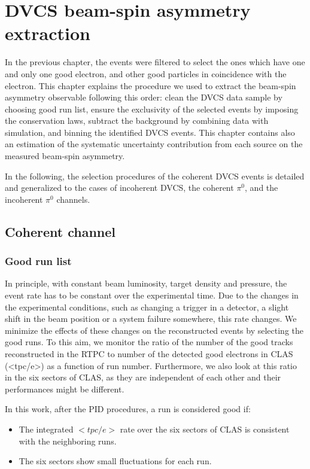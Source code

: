 \chapter{DVCS beam-spin asymmetry extraction}

In the previous chapter, the events were filtered to select the ones which have 
one and only one good electron, and other good particles in coincidence with 
the electron. This chapter explains the procedure we used to extract the 
beam-spin asymmetry observable following this order: clean the DVCS data sample 
by choosing good run list, ensure the exclusivity of the selected events by 
imposing the conservation laws, subtract the background by combining data with 
simulation, and binning the identified DVCS events. This chapter contains also 
an estimation of the systematic uncertainty contribution from each source on 
the measured beam-spin asymmetry.

In the following, the selection procedures of the coherent DVCS events is 
detailed and generalized to the cases of incoherent DVCS, the coherent 
$\pi^{0}$, and the incoherent $\pi^{0}$ channels.    
  
\section{Coherent channel}
\subsection{Good run list}
In principle, with constant beam luminosity, target density and pressure, the 
event rate has to be constant over the experimental time. Due to the changes in 
the experimental conditions, such as changing a trigger in a detector, a slight 
shift in the beam position or a system failure somewhere, this rate changes. We 
minimize the effects of these changes on the reconstructed events by selecting 
the good runs. To this aim, we monitor the ratio of the number of the good 
tracks reconstructed in the RTPC to number of the detected good electrons in 
CLAS (<tpc/e>) as a function of run number. Furthermore, we also look at this 
ratio in the six sectors of CLAS, as they are independent of each other and 
their performances might be different. 

In this work, after the PID procedures, a run is considered good if:
\begin{itemize}
\item The integrated $<tpc/e>$ rate over the six sectors of CLAS is consistent 
   with the neighboring runs.
\item The six sectors show small fluctuations for each run. 
\end{itemize}    

